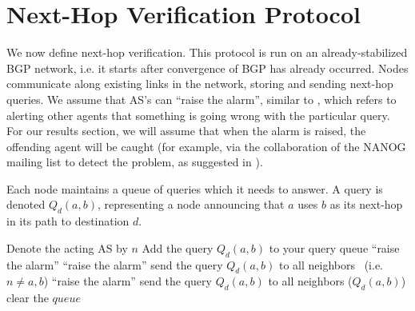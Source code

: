 \documentclass[10pt]{article}
\begin{document}
\section{Next-Hop Verification Protocol}
  We now define next-hop verification.
  This protocol is run on an already-stabilized BGP network,
  i.e. it starts after convergence of BGP has already occurred.
  Nodes communicate along existing links in the network, storing and sending
  next-hop queries. We assume that AS's can ``raise the alarm'', similar to
  \cite{Attraction}, which refers to alerting other agents that something
  is going wrong with the particular query. For our results section,
  we will assume that when the alarm is raised, the offending agent will be
  caught (for example, via the collaboration of the NANOG mailing list to detect
  the problem, as suggested in \cite{Attraction}).

  Each node maintains a queue of queries which it needs to answer.
  A query is denoted $Q_d(a,b)$, representing a node announcing that
  $a$ uses $b$ as its next-hop in its path to destination $d$.

  \begin{algorithmic}
    \State Denote the acting AS by $n$
        \State Add the query $Q_d(a,b)$ to your query queue
      \EndFor
    \EndFunction
        \State \Return
      \EndIf
          \State ``raise the alarm''
        \EndIf
        \State \Return
      \EndIf
          \State``raise the alarm''
        \EndIf
        \State send the query $Q_d(a,b)$ to all neighbors
      \Else \ (i.e. $n \neq a,b$)
          \State ``raise the alarm''
        \Else
        \State send the query $Q_d(a,b)$ to all neighbors
        \EndIf
      \EndIf
    \EndFunction
        ($Q_d(a,b)$)
      \EndFor
      \State clear the $queue$
    \EndFunction

  \end{algorithmic}
\end{document}
